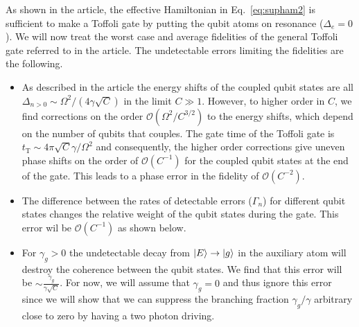 As shown in the article, the effective Hamiltonian in Eq.~\eqref{eq:supham2} is
sufficient to make a Toffoli gate by putting the qubit atoms on resonance
($\Delta_{e}=0$). We will now treat the worst case and average fidelities of the
general Toffoli gate referred to in the article. The undetectable errors
limiting the fidelities are the following.
\begin{itemize}
\item As described in the article the energy shifts of the coupled qubit states
are all $\Delta_{n>0}\sim\Omega^{2}/(4\gamma\sqrt{C})$ in the limit $C\gg1$.
However, to higher order in $C$, we find corrections on the order
$\mathcal{O}(\Omega^{2}/C^{3/2})$ to the energy shifts, which depend on the
number of qubits that couples. The gate time of the Toffoli gate is
$t_{\text{T}}\sim4\pi\sqrt{C}\gamma/\Omega^{2}$ and consequently, the higher
order corrections give uneven phase shifts on the order of $\mathcal{O}(C^{-1})$
for the coupled qubit states at the end of the gate. This leads to a phase error
in the fidelity of $\mathcal{O}(C^{-2})$.
\item The difference between the rates of detectable errors ($\Gamma_{n}$) for
different qubit states changes the relative weight of the qubit states during
the gate. This error wil be $\mathcal{O}(C^{-1})$ as shown below.
\item For $\gamma_{g}>0$ the undetectable decay from $| E \rangle\to| g \rangle$ in the
auxiliary atom will destroy the coherence between the qubit states. We find that
this error will be $\sim \frac{\gamma_{g}}{\gamma\sqrt{C}}$. For now, we will
assume that $\gamma_{g}=0$ and thus ignore this error since we will show that we
can suppress the branching fraction $\gamma_{g}/\gamma$ arbitrary close to zero
by having a two photon driving.
\end{itemize}  

